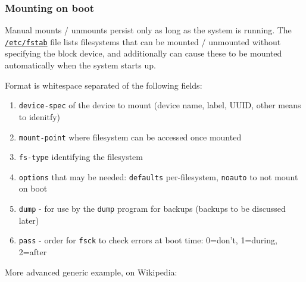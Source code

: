 \subsubsection{Mounting on boot}\label{mounting-on-boot}

Manual mounts / unmounts persist only as long as the system is running.
The \href{https://en.wikipedia.org/wiki/Fstab}{\texttt{/etc/fstab}} file
lists filesystems that can be mounted / unmounted without specifying the
block device, and additionally can cause these to be mounted
automatically when the system starts up.

Format is whitespace separated of the following fields:

\begin{enumerate}
\def\labelenumi{\arabic{enumi}.}
\item
  \texttt{device-spec} of the device to mount (device name, label, UUID,
  other means to idenitfy)
\item
  \texttt{mount-point} where filesystem can be accessed once mounted
\item
  \texttt{fs-type} identifying the filesystem
\item
  \texttt{options} that may be needed: \texttt{defaults} per-filesystem,
  \texttt{noauto} to not mount on boot
\item
  \texttt{dump} - for use by the \texttt{dump} program for backups
  (backups to be discussed later)
\item
  \texttt{pass} - order for \texttt{fsck} to check errors at boot time:
  0=don't, 1=during, 2=after
\end{enumerate}

More advanced generic example, on Wikipedia:


